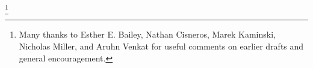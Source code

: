 \documentclass[12pt, a4paper, twoside]{article}
\begin{document}
    \thanks{Many thanks to Esther E. Bailey, Nathan Cisneros, Marek Kaminski, Nicholas Miller, and Aruhn Venkat for useful comments on earlier drafts and general encouragement.}
   \maketitle

    \newpage
\singlespacing
\clearpage
    \nolinenumbers
\begin{multicols}{2}
    \footnotesize{}   %
\end{multicols}

\singlespacing

\clearpage
% 
% 




\setcounter{section}{0} \renewcommand{\thesection}{Appendix \Alph{section}}%
\setcounter{table}{0}%
\clearpage
\setcounter{table}{0}%

%     


%     


%     
\end{document}
